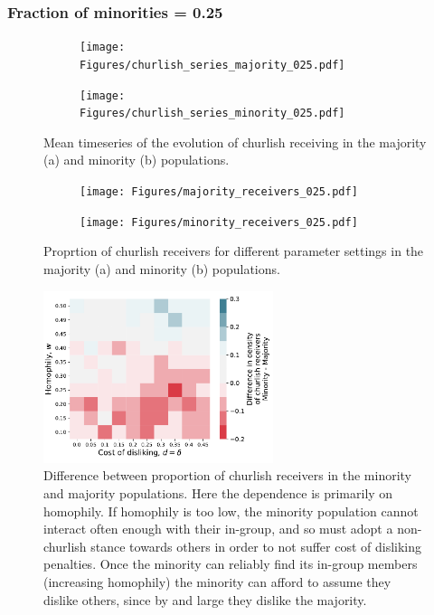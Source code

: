 \documentclass[11pt,letterpaper]{article}
\begin{document}
\subsubsection{Fraction of minorities = 0.25}

\begin{figure}[H]
  \centering
  \begin{subfigure}{0.49\textwidth}
    \centering
    \texttt{[image: Figures/churlish\_series\_majority\_025.pdf]}
    \caption{}
    \label{fig:}
  \end{subfigure}
  \begin{subfigure}{0.49\textwidth}
    \centering
    \texttt{[image: Figures/churlish\_series\_minority\_025.pdf]}
    \caption{}
    \label{fig:}
  \end{subfigure}
  \caption{Mean timeseries of the evolution of churlish receiving in the
    majority (a) and minority (b) populations.}
  \label{fig:regressions}
\end{figure}


\begin{figure}[H]
  \centering
  \begin{subfigure}{0.49\textwidth}
    \centering
    \texttt{[image: Figures/majority\_receivers\_025.pdf]}
    \caption{}
    \label{fig:}
  \end{subfigure}
  \begin{subfigure}{0.49\textwidth}
    \centering
    \texttt{[image: Figures/minority\_receivers\_025.pdf]}
    \caption{}
    \label{fig:}
  \end{subfigure}
  \caption{Proprtion of churlish receivers for different parameter settings in the
    majority (a) and minority (b) populations.}
  \label{fig:regressions}
\end{figure}

\begin{figure}[H]
  \centering
    \includegraphics[width=0.6\textwidth]{Figures/churlish_receivers_diff_025.pdf}
  \caption{Difference between proportion of churlish receivers in the minority 
    and majority populations. Here the dependence is primarily on homophily.
    If homophily is too low, the minority population cannot interact often
    enough with their in-group, and so must adopt a non-churlish stance towards
    others in order to not suffer cost of disliking penalties. Once the minority
    can reliably find its in-group members (increasing homophily) the minority
    can afford to assume they dislike others, since by and large they dislike
    the majority.
  }
  \label{fig:}
\end{figure}
\end{document}
